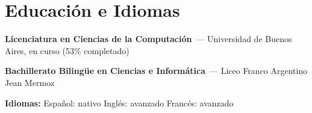 \section*{Educación e Idiomas}
\textbf{Licenciatura en Ciencias de la Computación}~--- Universidad de Buenos Aires, en curso (53\% completado)

\noindent \textbf{Bachillerato Bilingüe en Ciencias e Informática}~--- Liceo Franco Argentino Jean Mermoz

\noindent \textbf{Idiomas:} Español: nativo \;\textperiodcentered\; Inglés: avanzado \;\textperiodcentered\; Francés: avanzado
